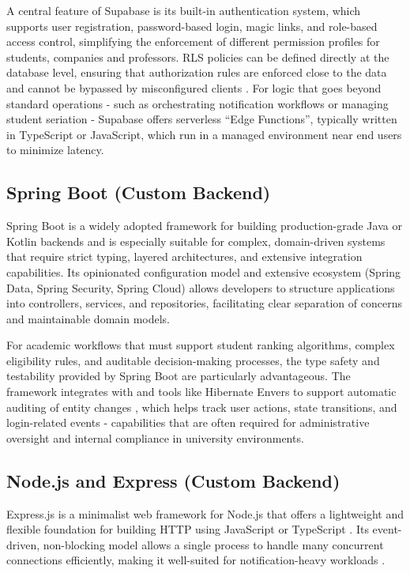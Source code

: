         {
            A central feature of Supabase is its built-in authentication system, which supports user registration, password-based login, magic links, and role-based access 
            control\cite{supabase-auth-overview}, simplifying the enforcement of different permission profiles for students, companies and professors. \gls{RLS}
            policies can be defined directly at the database level, ensuring that authorization rules are enforced close to the data and cannot be bypassed by misconfigured 
             clients \cite{supabase-rls}. For logic that goes beyond standard  operations - such as orchestrating notification workflows or managing student seriation - Supabase offers 
            serverless “Edge Functions”, typically written in TypeScript or JavaScript, which run in a managed environment near end users to minimize latency. \cite{supabase-edge-functions}
        }

    \subsection{Spring Boot (Custom Backend)}
        {
            Spring Boot is a widely adopted framework for building production-grade Java or Kotlin backends and is especially suitable for complex, domain-driven systems 
            that require strict typing, layered architectures, and extensive integration capabilities. Its opinionated configuration model and extensive ecosystem 
            (Spring Data, Spring Security, Spring Cloud) allows developers to structure applications into controllers, services, and repositories, facilitating clear 
            separation of concerns and maintainable domain models. \cite{springboot-docs-3x}
        }

        {
            For academic workflows that must support student ranking algorithms, complex eligibility rules, and auditable decision-making processes, the type safety and 
            testability provided by Spring Boot are particularly advantageous. The framework integrates with  and tools like Hibernate Envers to support automatic 
            auditing of entity changes \cite{springboot-docs-3x, hibernate-envers-43}, which helps track user actions, state transitions, and login-related events - capabilities that are often required for administrative 
            oversight and internal compliance in university environments. 
        }

    \subsection{Node.js and Express (Custom Backend)}
        {
            Express.js is a minimalist web framework for Node.js that offers a lightweight and flexible foundation for building HTTP  using JavaScript or TypeScript \cite{express-js}.
            Its event-driven, non-blocking  model allows a single process to handle many concurrent connections efficiently, making it well-suited for notification-heavy 
            workloads \cite{node-js}.
        }

